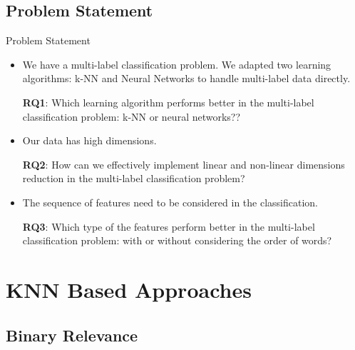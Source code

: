 \documentclass{beamer}
\begin{document}
\subsection{Problem Statement}

\begin{frame}[t]{Problem Statement}
    \small
    \begin{itemize}
        \item 
        We have a multi-label classification problem. We adapted two learning algorithms: k-NN and Neural Networks to handle multi-label data directly.
        
        \textbf{RQ1}: Which learning algorithm performs better in the multi-label classification problem: k-NN or neural networks?? 
        
        \item
        Our data has high dimensions.
        
        \textbf{RQ2}: How can we effectively implement linear and non-linear dimensions reduction in the multi-label classification problem?
        
        \item
        The sequence of features need to be considered in the classification.
        
        \textbf{RQ3}: Which type of the features perform better in the multi-label classification problem: with or without considering the order of words?
        
    \end{itemize}

    
\end{frame}

\section{KNN Based Approaches}

\subsection{Binary Relevance}
\end{document}
